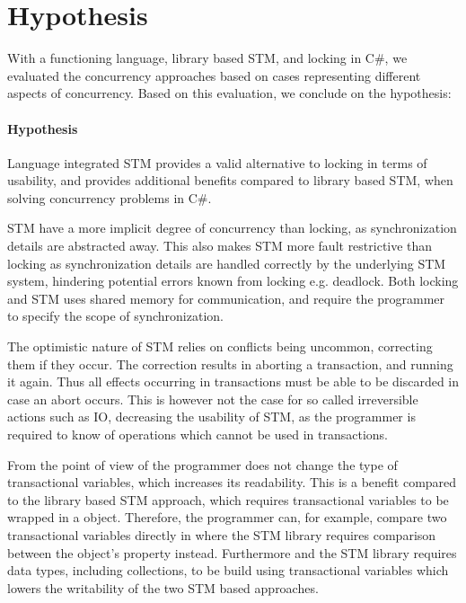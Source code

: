 \section{Hypothesis}
With a functioning \stmname language, library based \ac{STM}, and locking in C\#, we evaluated the concurrency approaches based on cases representing different aspects of concurrency. Based on this evaluation, we conclude on the hypothesis: 

\paragraph{Hypothesis} Language integrated \ac{STM} provides a valid alternative to locking in terms of usability, and provides additional benefits compared to library based \ac{STM}, when solving concurrency problems in C\#. 

\ac{STM} have a more implicit degree of concurrency than locking, as synchronization details are abstracted away. This also makes \ac{STM} more fault restrictive than locking as synchronization details are handled correctly by the underlying \ac{STM} system, hindering potential errors known from locking e.g. deadlock. Both locking and \ac{STM} uses shared memory for communication, and require the programmer to specify the scope of synchronization.

The optimistic nature of \ac{STM} relies on conflicts being uncommon,  correcting them if they occur. The correction results in aborting a transaction, and running it again. Thus all effects occurring in transactions must be able to be discarded in case an abort occurs. This is however not the case for so called irreversible actions such as \ac{IO},  decreasing the usability of \ac{STM}, as the programmer is required to know of operations which cannot be used in transactions.

From the point of view of the programmer \stmname does not change the type of transactional variables, which increases  its readability. This is a benefit compared to the library based \ac{STM} approach, which requires transactional variables to be wrapped in a  object. Therefore, the programmer can, for example,  compare two transactional variables directly in \stmname where the \ac{STM} library requires comparison between the  object's  property instead. Furthermore \stmname and the \ac{STM} library requires data types, including collections, to be build using transactional variables which lowers the writability of the two \ac{STM} based approaches.  %

